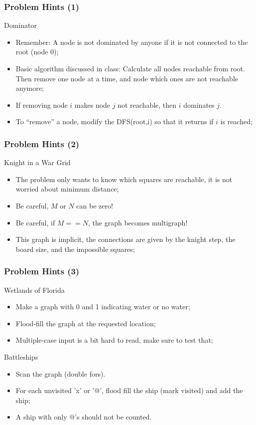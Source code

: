 \documentclass{beamer}
\begin{document}
\begin{frame}
  \frametitle{Problem Hints (1)}
  {\smaller
  \begin{block}{Dominator}
    \begin{itemize}
    \item Remember: A node is not dominated by anyone if it is not connected to the root (node 0);
    \item Basic algorithm discussed in class: Calculate all nodes
      reachable from root. Then remove one node at a time, and node which ones are not reachable anymore;
    \item If removing node $i$ makes node $j$ not reachable, then $i$ dominates $j$.
    \item To ``remove'' a node, modify the DFS(root,i) so that it returns if $i$ is reached;
    \end{itemize}
  \end{block}
  }
\end{frame}

\begin{frame}
  \frametitle{Problem Hints (2)}
  {\smaller
  \begin{block}{Knight in a War Grid}
    \begin{itemize}
    \item The problem only wants to know which squares are reachable,
      it is not worried about minimum distance;
    \item Be careful, $M$ or $N$ can be zero!
    \item Be careful, if $M == N$, the graph becomes multigraph!
    \item This graph is implicit, the connections are given by the
      knight step, the board size, and the impossible squares;
    \end{itemize}
  \end{block}
  }
\end{frame}

\begin{frame}
  \frametitle{Problem Hints (3)}
  {\smaller
  \begin{block}{Wetlands of Florida}
    \begin{itemize}
      \item Make a graph with 0 and 1 indicating water or no water;
      \item Flood-fill the graph at the requested location;
      \item Multiple-case input is a bit hard to read, make sure to test that;
    \end{itemize}
  \end{block}
  \begin{block}{Battleships}
    \begin{itemize}
      \item Scan the graph (double fors). 
      \item For each unvisited 'x' or '@', flood fill the ship (mark
        visited) and add the ship;
      \item A ship with only @'s should not be counted.
    \end{itemize}
  \end{block}}
\end{frame}
\end{document}
